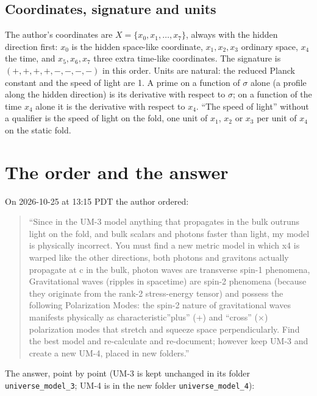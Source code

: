 \documentclass[
  10pt,
]{article}
\begin{document}
\hypertarget{coordinates-signature-and-units}{%
\subsection{Coordinates, signature and
units}\label{coordinates-signature-and-units}}

The author's coordinates are \(X = \{x_0, x_1, \dots, x_7\}\), always
with the hidden direction first: \(x_0\) is the hidden space-like
coordinate, \(x_1, x_2, x_3\) ordinary space, \(x_4\) the time, and
\(x_5, x_6, x_7\) three extra time-like coordinates. The signature is
\((+,+,+,+,-,-,-,-)\) in this order. Units are natural: the reduced
Planck constant and the speed of light are 1. A prime on a function of
\(\sigma\) alone (a profile along the hidden direction) is its
derivative with respect to \(\sigma\); on a function of the time \(x_4\)
alone it is the derivative with respect to \(x_4\). ``The speed of
light'' without a qualifier is the speed of light on the fold, one unit
of \(x_1\), \(x_2\) or \(x_3\) per unit of \(x_4\) on the static fold.

\hypertarget{the-order-and-the-answer}{%
\section{The order and the answer}\label{the-order-and-the-answer}}

On 2026-10-25 at 13:15 PDT the author ordered:

\begin{quote}
``Since in the UM-3 model anything that propagates in the bulk outruns
light on the fold, and bulk scalars and photons faster than light, my
model is physically incorrect. You must find a new metric model in which
x4 is warped like the other directions, both photons and gravitons
actually propagate at c in the bulk, photon waves are transverse spin-1
phenomena, Gravitational waves (ripples in spacetime) are spin-2
phenomena (because they originate from the rank-2 stress-energy tensor)
and possess the following Polarization Modes: the spin-2 nature of
gravitational waves manifests physically as characteristic''plus'' (+)
and ``cross'' (×) polarization modes that stretch and squeeze space
perpendicularly. Find the best model and re-calculate and re-document;
however keep UM-3 and create a new UM-4, placed in new folders.''
\end{quote}

The answer, point by point (UM-3 is kept unchanged in its folder
\texttt{universe\_model\_3}; UM-4 is in the new folder
\texttt{universe\_model\_4}):
\end{document}

